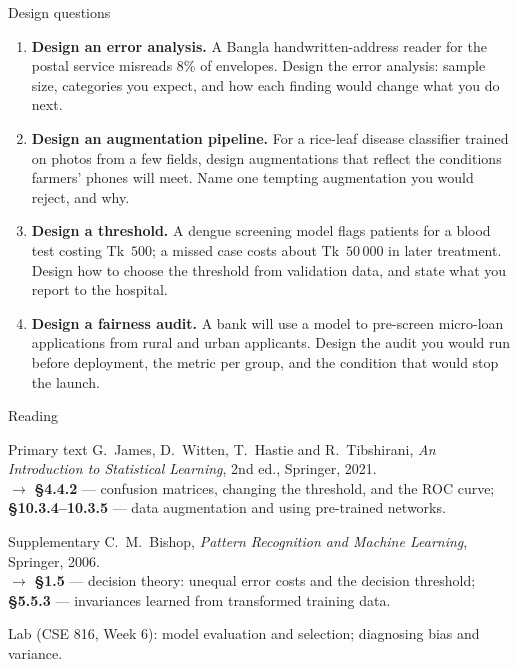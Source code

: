 \documentclass[aspectratio=169,10pt]{beamer}
\begin{document}
\begin{frame}{Design questions}
  \footnotesize
  \begin{enumerate}
    \item \textbf{Design an error analysis.} A Bangla handwritten-address reader for the
          postal service misreads $8\%$ of envelopes. Design the error analysis: sample
          size, categories you expect, and how each finding would change what you do next.
          \hfill{}
    \item \textbf{Design an augmentation pipeline.} For a rice-leaf disease classifier
          trained on photos from a few fields, design augmentations that reflect the
          conditions farmers' phones will meet. Name one tempting augmentation you would
          reject, and why. \hfill{}
    \item \textbf{Design a threshold.} A dengue screening model flags patients for a blood
          test costing Tk~$500$; a missed case costs about Tk~$50\,000$ in later treatment.
          Design how to choose the threshold from validation data, and state what you
          report to the hospital. \hfill{}
    \item \textbf{Design a fairness audit.} A bank will use a model to pre-screen
          micro-loan applications from rural and urban applicants. Design the audit you
          would run before deployment, the metric per group, and the condition that would
          stop the launch. \hfill{}
  \end{enumerate}
\end{frame}

\begin{frame}{Reading}
  \begin{block}{Primary text}
    G.~James, D.~Witten, T.~Hastie and R.~Tibshirani,
    \emph{An Introduction to Statistical Learning}, 2nd ed., Springer, 2021.\\[2pt]
    \hfill{\small$\rightarrow$ \textbf{\S4.4.2} --- confusion matrices, changing the
    threshold, and the ROC curve; \textbf{\S10.3.4--10.3.5} --- data augmentation and
    using pre-trained networks.}
  \end{block}
  \begin{block}{Supplementary}
    C.~M.~Bishop, \emph{Pattern Recognition and Machine Learning}, Springer, 2006.\\[2pt]
    \hfill{\small$\rightarrow$ \textbf{\S1.5} --- decision theory: unequal error costs and
    the decision threshold; \textbf{\S5.5.3} --- invariances learned from transformed
    training data.}
  \end{block}
  \vspace{1mm}
  \begin{center}
    \small\color{cugray}
    Lab (CSE 816, Week 6): model evaluation and selection; diagnosing bias and variance.
  \end{center}
\end{frame}
\end{document}
